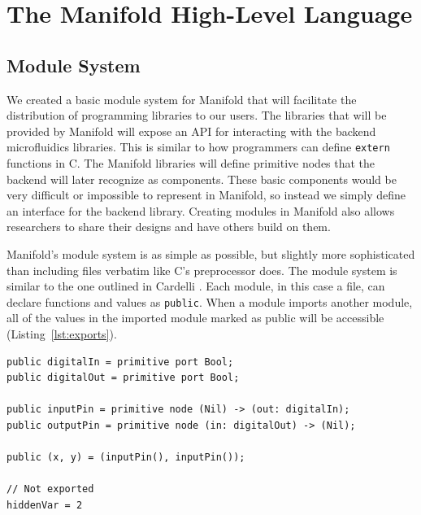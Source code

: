 \section{The Manifold High-Level Language}

\subsection{Module System}

We created a basic module system for Manifold that will facilitate the
distribution of programming libraries to our users. The libraries that will be
provided by Manifold will expose an API for interacting with the backend
microfluidics libraries. This is similar to how programmers can define
\texttt{extern} functions in C. The Manifold libraries will define primitive
nodes that the backend will later recognize as components. These basic
components would be very difficult or impossible to represent in Manifold, so
instead we simply define an interface for the backend library. Creating
modules in Manifold also allows researchers to share their designs and have
others build on them.

Manifold's module system is as simple as possible, but slightly more
sophisticated than including files verbatim like C's preprocessor does.
The module system is similar to the one outlined in Cardelli
\cite{Cardelli:1997:PFL:263699.263735}. Each module, in this case a file, can
declare functions and values as \texttt{public}. When a module imports another
module, all of the values in the imported module marked as public will be
accessible (Listing~\ref{lst:exports}).

\begin{lstlisting}[label=lst:exports, caption=Exported values in a Manifold file]
public digitalIn = primitive port Bool;
public digitalOut = primitive port Bool;

public inputPin = primitive node (Nil) -> (out: digitalIn);
public outputPin = primitive node (in: digitalOut) -> (Nil);

public (x, y) = (inputPin(), inputPin());

// Not exported
hiddenVar = 2
\end{lstlisting}


